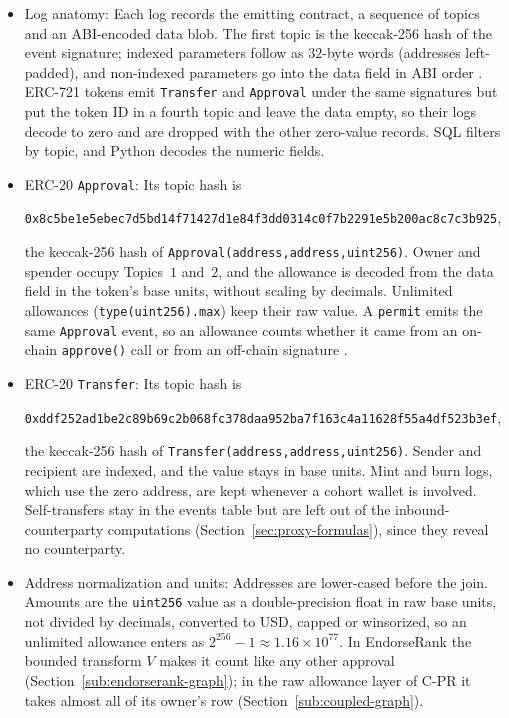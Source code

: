 \begin{itemize}
\item Log anatomy: Each log records the emitting contract, a sequence of topics and an ABI-encoded data blob. The first topic is the keccak-256 hash of the event signature; indexed parameters follow as $32$-byte words (addresses left-padded), and non-indexed parameters go into the data field in ABI order . ERC-721 tokens emit \texttt{Transfer} and \texttt{Approval} under the same signatures but put the token ID in a fourth topic and leave the data empty, so their logs decode to zero and are dropped with the other zero-value records. SQL filters by topic, and Python decodes the numeric fields.

\item ERC-20 \texttt{Approval}: Its topic hash is
\begin{center}
\texttt{0x8c5be1e5ebec7d5bd14f71427d1e84f3dd0314c0f7b2291e5b200ac8c7c3b925},
\end{center}
the keccak-256 hash of \texttt{Approval(address,address,uint256)}. Owner and spender occupy Topics~$1$ and~$2$, and the allowance is decoded from the data field in the token's base units, without scaling by decimals. Unlimited allowances (\texttt{type(uint256).max}) keep their raw value. A \texttt{permit} emits the same \texttt{Approval} event, so an allowance counts whether it came from an on-chain \texttt{approve()} call or from an off-chain signature .

\item ERC-20 \texttt{Transfer}: Its topic hash is
\begin{center}
\texttt{0xddf252ad1be2c89b69c2b068fc378daa952ba7f163c4a11628f55a4df523b3ef},
\end{center}
the keccak-256 hash of \texttt{Transfer(address,address,uint256)}. Sender and recipient are indexed, and the value stays in base units. Mint and burn logs, which use the zero address, are kept whenever a cohort wallet is involved. Self-transfers stay in the events table but are left out of the inbound-counterparty computations (Section~\ref{sec:proxy-formulas}), since they reveal no counterparty.

\item Address normalization and units: Addresses are lower-cased before the join. Amounts are the \texttt{uint256} value as a double-precision float in raw base units, not divided by decimals, converted to USD, capped or winsorized, so an unlimited allowance enters as $2^{256}-1\approx1.16\times10^{77}$. In EndorseRank the bounded transform $V$ makes it count like any other approval (Section~\ref{sub:endorserank-graph}); in the raw allowance layer of C-PR it takes almost all of its owner's row (Section~\ref{sub:coupled-graph}).

\end{itemize}

